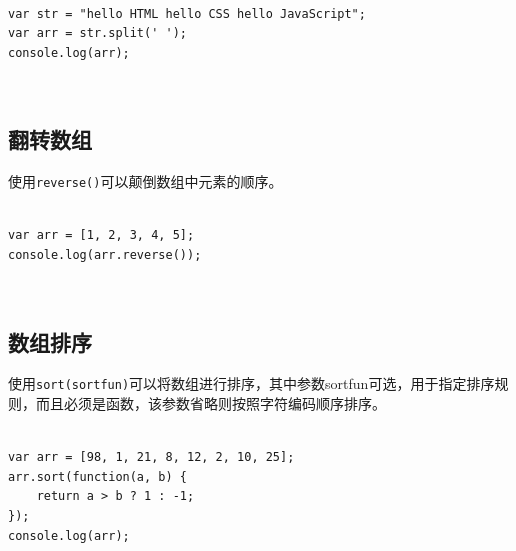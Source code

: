  \\

\begin{lstlisting}[style=htmlcssjs]
var str = "hello HTML hello CSS hello JavaScript";
var arr = str.split(' ');
console.log(arr);
\end{lstlisting}

\begin{tcolorbox}
	 \\
\end{tcolorbox}

\subsection{翻转数组}

使用\lstinline|reverse()|可以颠倒数组中元素的顺序。 \\

 \\

\begin{lstlisting}[style=htmlcssjs]
var arr = [1, 2, 3, 4, 5];
console.log(arr.reverse());
\end{lstlisting}

\begin{tcolorbox}
	 \\
	\text{[5, 4, 3, 2, 1]}
\end{tcolorbox}

\subsection{数组排序}

使用\lstinline|sort(sortfun)|可以将数组进行排序，其中参数sortfun可选，用于指定排序规则，而且必须是函数，该参数省略则按照字符编码顺序排序。 \\

 \\

\begin{lstlisting}[style=htmlcssjs]
var arr = [98, 1, 21, 8, 12, 2, 10, 25];
arr.sort(function(a, b) {
    return a > b ? 1 : -1;
});
console.log(arr);
\end{lstlisting}

\begin{tcolorbox}
	 \\
	\text{[1, 2, 8, 10, 12, 21, 25, 98]}
\end{tcolorbox}

